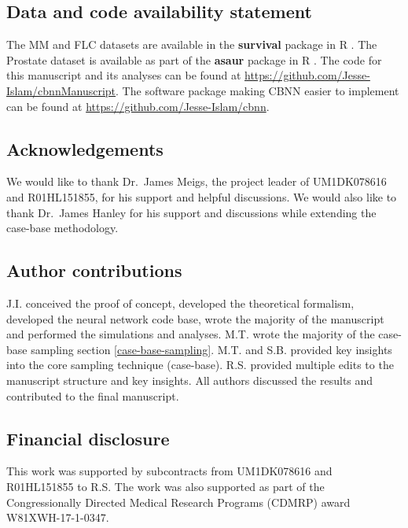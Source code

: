 \documentclass[preprint,12pt]{elsarticle}
\begin{document}

\hypertarget{data-and-code-availability-statement}{%
\subsection*{Data and code availability
statement}\label{data-and-code-availability-statement}}


The MM and FLC datasets are available in the \textbf{survival} package in R
\citep{survpkg}. The Prostate dataset is available as part of the \textbf{asaur} package in R \citep{asaur}.
The code for this manuscript and its analyses can be found at \url{https://github.com/Jesse-Islam/cbnnManuscript}. The software package making CBNN
easier to implement can be found at \url{https://github.com/Jesse-Islam/cbnn}.

\hypertarget{acknowledgements}{%
\subsection*{Acknowledgements}\label{acknowledgements}}

We would like to thank Dr.~James Meigs, the project leader of UM1DK078616 and R01HL151855, for his support and helpful discussions.
We would also like to thank Dr.~James Hanley for his support and discussions while extending the case-base methodology.

\subsection*{Author contributions}

J.I. conceived the proof of concept, developed the theoretical formalism, developed the neural network code base,
wrote the majority of the manuscript and performed the simulations and analyses. M.T. wrote the majority of the case-base sampling section \ref{case-base-sampling}.
M.T. and S.B. provided key insights into the core sampling technique (case-base). R.S. provided multiple edits to the manuscript structure and key insights. All authors
discussed the results and contributed to the final manuscript.

\subsection*{Financial disclosure}

This work was supported by subcontracts from UM1DK078616 and R01HL151855
to R.S. The work was also supported as part of the Congressionally Directed Medical Research Programs (CDMRP) award W81XWH-17-1-0347.
\end{document}
